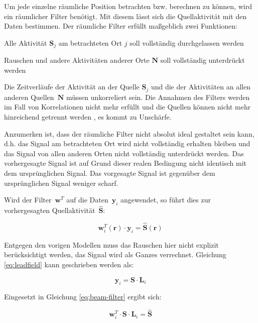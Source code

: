 \documentclass[doc,a4paper,12pt]{apa6}
\newcommand{\mx}[1]{\mathbf{#1}}
\begin{document}
Um jede einzelne räumliche Position betrachten bzw. berechnen zu können, wird ein räumlicher Filter benötigt. Mit diesem lässt sich die Quellaktivität mit den Daten bestimmen. Der räumliche Filter erfüllt maßgeblich zwei Funktionen:

\begin{compactitem}
\item Alle Aktivität $\mx{S}_j$ am betrachteten Ort $j$ soll vollständig durchgelassen werden
\item Rauschen und andere Aktivitäten anderer Orte $\mx{N}$ soll vollständig unterdrückt werden
\end{compactitem}

Die Zeitverläufe der Aktivität an der Quelle $\mx{S}_j$ und die der Aktivitäten an allen anderen Quellen~$\mx{N}$ müssen unkorreliert sein. Die Annahmen des Filters werden im Fall von Korrelationen nicht mehr erfüllt und die Quellen können nicht mehr hinreichend getrennt werden \parencite{van1997localization}, es kommt zu Unschärfe.

Anzumerken ist, dass der räumliche Filter nicht absolut ideal gestaltet sein kann, d.h. das Signal am betrachteten Ort wird nicht vollständig erhalten bleiben und das Signal von allen anderen Orten nicht vollständig unterdrückt werden. Das vorhergesagte Signal ist auf Grund dieser realen Bedingung nicht identisch mit dem ursprünglichen Signal. Das vorgesagte Signal ist gegenüber dem ursprünglichen Signal weniger scharf.

Wird der Filter~$\mx{w}^T$ auf die Daten~$\mx{y}_i$ angewendet, so führt dies zur vorhergesagten Quellaktivität~$\mx{\hat S}$:

\begin{equation}
\label{eq:beam-filter}
\mx{w}_i^T(\mx{r}) \cdot \mx{y}_i = \mx{\hat S}(\mx{r})
\end{equation}

Entgegen den vorigen Modellen muss das Rauschen hier nicht explizit berücksichtigt werden, das Signal wird als Ganzes verrechnet. Gleichung \ref{eq:leadfield} kann geschrieben werden als:

\begin{equation}
\mx{y}_i = \mx{S} \cdot \mx{L}_i
\end{equation}

Eingesetzt in Gleichung \ref{eq:beam-filter} ergibt sich:

\begin{equation}
\mx{w}_i^T \cdot \mx{S} \cdot \mx{L}_i = \mx{\hat S}
\end{equation}
\end{document}
